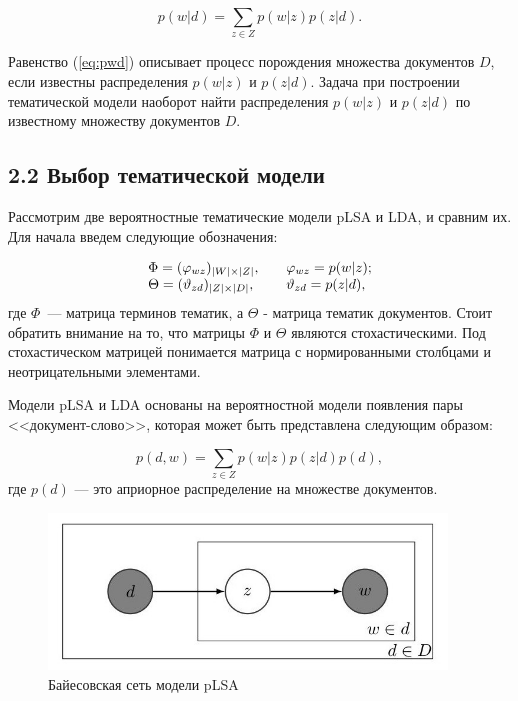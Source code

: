 \documentclass[a4paper]{report}
\begin{document}
	\begin{equation}
		p(w|d) = \sum_{z \in Z} p(w|z)p(z|d).
	\label{eq:pwd}
	\end{equation}
	
	Равенство (\ref{eq:pwd}) описывает процесс порождения множества документов $D$, если известны распределения $p(w|z)$ и  $p(z|d)$. Задача при построении тематической модели наоборот найти распределения $p(w|z)$ и  $p(z|d)$ по известному множеству документов $D$.
	
	\subsection{2.2 Выбор тематической модели}
	
	Рассмотрим две вероятностные тематические модели pLSA и LDA, и сравним их. 
	Для начала введем следующие обозначения:
	
	\begin{equation}
		\begin{array}{l l}
			
			\Phi = (\varphi_{wz})_{|W| \times |Z|}, & \quad
				\varphi_{wz} = p(w|z); \\
			\Theta = (\vartheta_{zd})_{|Z| \times |D|}, & \quad
				\vartheta_{zd} = p(z|d),
		\end{array}
		\label{eq:desc}
	\end{equation}
	где $\Phi$~--- матрица терминов тематик, а $\Theta$ - матрица тематик документов. Стоит обратить внимание на то, что матрицы $\Phi$ и $\Theta$ являются стохастическими. Под стохастическом матрицей понимается матрица с нормированными столбцами и неотрицательными элементами.
	
	Модели pLSA и LDA основаны на вероятностной модели появления пары <<документ-слово>>,  которая может быть представлена следующим образом:
	
	\begin{equation}
	p(d,w) = \sum_{z \in Z}p(w|z) p(z|d) p(d),
	\label{eq:pmodel}
	\end{equation}
	где $p(d)$ --- это априорное распределение на множестве документов.
	
	
	\begin{figure}
		\centering
		\includegraphics[width=400px]
		{imgs/PLSA.jpg}
		\caption{Байесовская сеть модели pLSA}
		\label{fig:plsa}
	\end{figure} 
	
\end{document}
